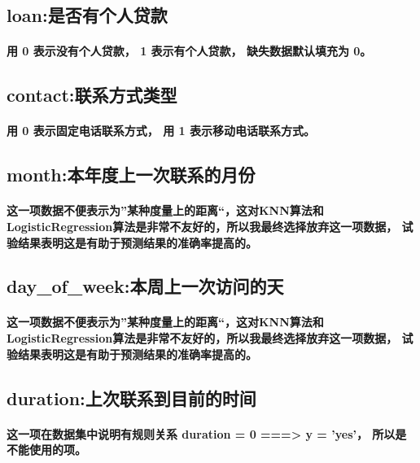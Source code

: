 \documentclass{ctexart}
\begin{document}
        \subsection{loan:是否有个人贷款}
        \paragraph{
            用 0 表示没有个人贷款， 1 表示有个人贷款， 缺失数据默认填充为 0。
        }
        \subsection{contact:联系方式类型}
        \paragraph{
            用 0 表示固定电话联系方式， 用 1 表示移动电话联系方式。
        }
        \subsection{month:本年度上一次联系的月份}
        \paragraph{
            这一项数据不便表示为”某种度量上的距离“，这对KNN算法和LogisticRegression算法是非常不友好的，所以我最终选择放弃这一项数据，
            试验结果表明这是有助于预测结果的准确率提高的。
        }
        \subsection{day\_of\_week:本周上一次访问的天}
        \paragraph{
            这一项数据不便表示为”某种度量上的距离“，这对KNN算法和LogisticRegression算法是非常不友好的，所以我最终选择放弃这一项数据，
            试验结果表明这是有助于预测结果的准确率提高的。
        }
        \subsection{duration:上次联系到目前的时间}
        \paragraph{
            这一项在数据集中说明有规则关系 duration = 0 ===> y = 'yes'， 所以是不能使用的项。
        }
\end{document}
